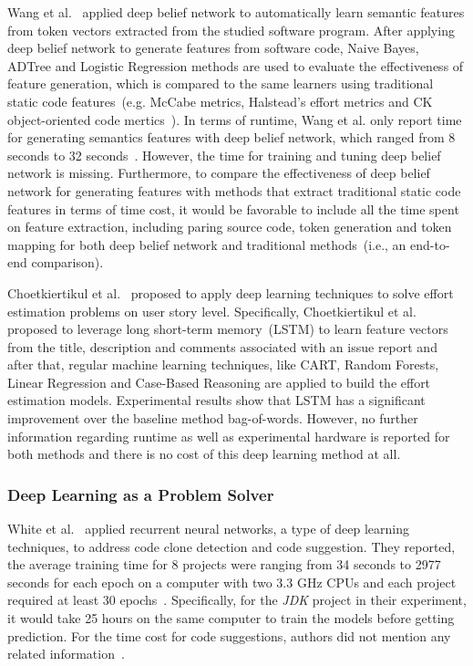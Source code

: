 \documentclass[sigconf]{acmart}
\theoremstyle{break}
\begin{document}
 Wang et al.~\cite{wang2016automatically} applied deep belief network to automatically
 learn semantic features from token vectors extracted from the studied software program. After
 applying deep belief network to generate features from software code,
 Naive Bayes, ADTree and Logistic Regression methods are used to evaluate the effectiveness
 of feature generation, which is compared to the same learners using traditional 
 static code features~(e.g.  McCabe metrics, Halstead's effort metrics and  CK object-oriented code mertics~\cite{kafura1987use,chidamber1994metrics,mccabe1976complexity,halstead1977elements}). In terms of
 runtime, Wang et al. only report time for generating semantics features with deep belief network, which
 ranged from 8 seconds to 32 seconds~\cite{wang2016automatically}. However, the time for training and tuning deep belief network is
 missing. Furthermore, to compare the effectiveness of deep belief network for generating features with methods that extract traditional 
 static code features in terms of time cost, 
 it would be favorable to include all the time spent on feature extraction, including
 paring source code, token generation and token mapping for both deep belief network and traditional methods~(i.e., an end-to-end comparison).
 
 Choetkiertikul et al.~\cite{choetkiertikul2016deep} proposed to apply deep learning techniques
 to solve effort estimation problems on user story level. 
 Specifically,  Choetkiertikul et al. ~\cite{choetkiertikul2016deep} proposed to leverage
 long short-term memory~(LSTM) to learn feature vectors from the title,
 description and comments associated with an issue report and after that,
 regular machine learning techniques, like CART, Random Forests, 
 Linear Regression and Case-Based Reasoning are applied to build the effort
 estimation models. Experimental results show that
 LSTM has a 
 significant improvement over the baseline method bag-of-words.
 However, no further information regarding
 runtime as well as experimental hardware  is reported for both methods and there is no cost 
 of this deep learning method at all.
 
 
\noindent
\subsubsection{Deep Learning as  a Problem Solver}

 White et al.~\cite{white2015toward, white2016deep} applied
 recurrent neural networks, a type of  deep learning techniques, 
 to address code clone detection and code suggestion. They reported,
 the average training time for 8 projects were ranging from 34 seconds
  to 2977 seconds for each epoch on a computer with two 3.3 GHz
 CPUs and each project required at least 30 epochs~\cite{white2016deep}.
Specifically, for the {\it JDK} project in their experiment, it would take 25 hours 
 on the same computer to train the models before getting prediction.
 For the time cost for code suggestions, authors did not mention any related information~\cite{white2015toward}.
\end{document}

